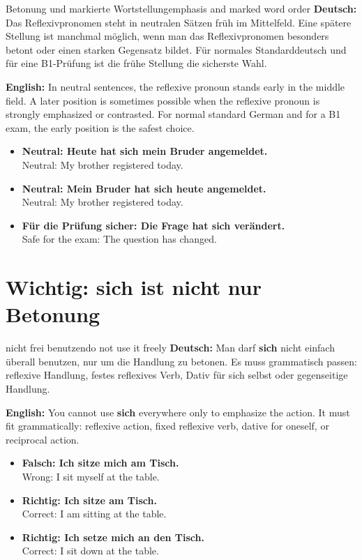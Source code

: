 \documentclass[a4paper,11pt]{article}
\newcommand{\GermanText}[1]{\textbf{Deutsch: }#1\par}
\newcommand{\EnglishText}[1]{{\small\color{SoftGray}\textbf{English: }#1\par}}
\newcommand{\ExampleItem}[2]{\item \textbf{#1}\\{\small\color{SoftGray}#2}}
\begin{document}
        \begin{grammarentry}{Betonung und markierte Wortstellung}{emphasis and marked word order}
            \GermanText{Das Reflexivpronomen steht in neutralen Sätzen früh im Mittelfeld. Eine spätere Stellung ist manchmal möglich, wenn man das Reflexivpronomen besonders betont oder einen starken Gegensatz bildet. Für normales Standarddeutsch und für eine B1-Prüfung ist die frühe Stellung die sicherste Wahl.}
            \EnglishText{In neutral sentences, the reflexive pronoun stands early in the middle field. A later position is sometimes possible when the reflexive pronoun is strongly emphasized or contrasted. For normal standard German and for a B1 exam, the early position is the safest choice.}

            \begin{exbox}
                \begin{itemize}
                    \ExampleItem{Neutral: Heute hat sich mein Bruder angemeldet.}{Neutral: My brother registered today.}
                    \ExampleItem{Neutral: Mein Bruder hat sich heute angemeldet.}{Neutral: My brother registered today.}
                    \ExampleItem{Für die Prüfung sicher: Die Frage hat sich verändert.}{Safe for the exam: The question has changed.}
                \end{itemize}
            \end{exbox}
        \end{grammarentry}

    \section{Wichtig: sich ist nicht nur Betonung}
        
        \begin{grammarentry}{nicht frei benutzen}{do not use it freely}
            \GermanText{Man darf \textbf{sich} nicht einfach überall benutzen, nur um die Handlung zu betonen. Es muss grammatisch passen: reflexive Handlung, festes reflexives Verb, Dativ für sich selbst oder gegenseitige Handlung.}
            \EnglishText{You cannot use \textbf{sich} everywhere only to emphasize the action. It must fit grammatically: reflexive action, fixed reflexive verb, dative for oneself, or reciprocal action.}
            
            \begin{exbox}
                \begin{itemize}
                    \ExampleItem{Falsch: Ich sitze mich am Tisch.}{Wrong: I sit myself at the table.}
                    \ExampleItem{Richtig: Ich sitze am Tisch.}{Correct: I am sitting at the table.}
                    \ExampleItem{Richtig: Ich setze mich an den Tisch.}{Correct: I sit down at the table.}
                \end{itemize}
            \end{exbox}
        \end{grammarentry}
\end{document}

